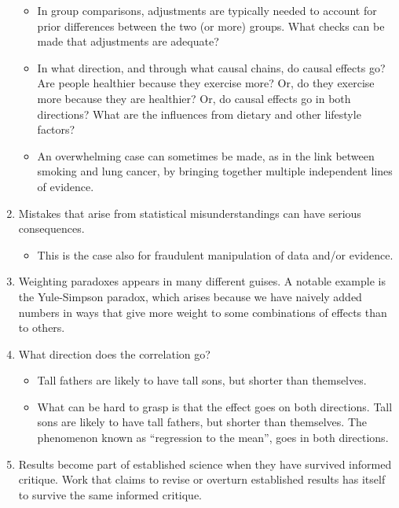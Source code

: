 \documentclass[
  10pt,
  b5paper]{book}
\providecommand{\tightlist}{%
  \setlength{\itemsep}{0pt}\setlength{\parskip}{0pt}}
\begin{document}
\begin{enumerate}
  \begin{itemize}
  \tightlist
  \item
    In group comparisons, adjustments are typically needed
    to account for prior differences between the two (or more)
    groups. What checks can be made that adjustments are adequate?
  \item
    In what direction, and through what causal chains, do causal
    effects go? Are people healthier because they exercise more?
    Or, do they exercise more because they are healthier? Or, do
    causal effects go in both directions? What are the influences
    from dietary and other lifestyle factors?
  \item
    An overwhelming case can sometimes be made, as in the link
    between smoking and lung cancer, by bringing together multiple
    independent lines of evidence.
  \end{itemize}
\item
  Mistakes that arise from statistical misunderstandings
  can have serious consequences.

  \begin{itemize}
  \tightlist
  \item
    This is the case also for fraudulent manipulation of
    data and/or evidence.
  \end{itemize}
\item
  Weighting paradoxes appears in many different guises.
  A notable example is the Yule-Simpson paradox, which arises
  because we have naively added numbers in ways that give more
  weight to some combinations of effects than to others.
\item
  What direction does the correlation go?

  \begin{itemize}
  \tightlist
  \item
    Tall fathers are likely to have tall sons, but shorter than themselves.
  \item
    What can be hard to grasp is that the effect goes on both directions.
    Tall sons are likely to have tall fathers, but shorter than themselves.
    The phenomenon known as ``regression to the mean'',
    goes in both directions.
  \end{itemize}
\item
  Results become part of established science when they have
  survived informed critique. Work that claims to revise or overturn
  established results has itself to survive the same informed critique.


\end{enumerate}
\end{document}
